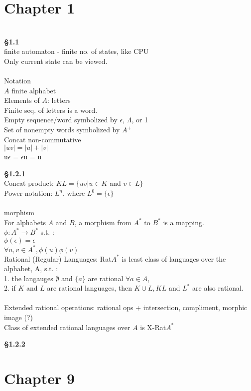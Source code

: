 \documentclass[12pt]{article}
\begin{document}
\tableofcontents

\newpage %

\section{Chapter 1}
\ \\
\textbf{\S{1.1}}\\
finite automaton - finite no. of states, like CPU\\
Only current state can be viewed.\\
\ \\
Notation\\
$A$ finite alphabet\\
Elements of $A$: letters\\
Finite seq. of letters is a word.\\
Empty sequence/word symbolized by $\epsilon$, $\Lambda$, or 1\\
Set of nonempty words symbolized by $A^{+}$\\
Concat non-commutative\\
$|uv| = |u| + |v|$\\
u$\epsilon$ = $\epsilon$u = u
\newpage %

\textbf{\S{1.2.1}}\\
Concat product: $KL = \{uv | u \in K$ and $v \in L\}$\\
Power notation: $L^{n}$, where $L^{0} = \{ \epsilon \}$\\
\ \\
morphism\\

For alphabets $A$ and $B$, a morphism from $A^{*}$ to $B^{*}$ is a mapping.\\ 
$\phi: A^{*} \to B^{*}$ s.t. :\\
$\phi(\epsilon) = \epsilon$\\
$\forall u,v \in A^{*}, \phi(u)\phi(v)$\\
Rational (Regular) Languages: Rat$A^{*}$ is least class of languages over the alphabet, A, s.t. :\\
1. the langauges $\emptyset$ and $\{ a \}$ are rational $\forall a \in A$,\\
2. if $K$ and $L$ are rational languages, then $K \cup L, KL$ and $L^{*}$ are also rational.\\
\ \\
Extended rational operations: rational ops + intersection, compliment, morphic image (?)\\
Class of extended rational languages over $A$ is X-Rat$A^{*}$  

\newpage %

\textbf{\S{1.2.2}}\\

\section{Chapter 9}
\end{document}
